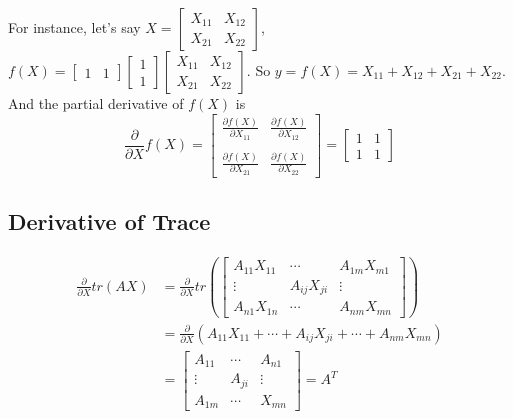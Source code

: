 \documentclass[titlepage]{article}
\begin{document}
For instance, let's say $X=\begin{bmatrix} X_{11}&X_{12}\\X_{21}&X_{22} \end{bmatrix}$,
$f(X)=\begin{bmatrix}1&1\end{bmatrix}\begin{bmatrix}1\\1\end{bmatrix}
\begin{bmatrix} X_{11}&X_{12}\\X_{21}&X_{22} \end{bmatrix}.$
So $y=f(X)=X_{11}+X_{12}+X_{21}+X_{22}.$ And the partial derivative of $f(X)$ is
\begin{equation}
    \frac{\partial}{\partial X}f(X) = 
    \begin{bmatrix} 
        \frac{\partial f(X)}{\partial X_{11}} & \frac{\partial f(X)}{\partial X_{12}} \\ \\
        \frac{\partial f(X)}{\partial X_{21}} & \frac{\partial f(X)}{\partial X_{22}}
     \end{bmatrix}
     =
     \begin{bmatrix} 
        1 & 1 \\
        1 & 1
     \end{bmatrix}
\end{equation}

\subsection{Derivative of Trace}

\begin{equation}
    \begin{aligned}
        \frac{\partial}{\partial X}tr({AX}) &= \frac{\partial}{\partial X} tr(
        \begin{bmatrix}
            A_{11}X_{11} & \cdots & A_{1m}X_{m1} \\
            \vdots & A_{ij}X_{ji} & \vdots \\
            A_{n1}X_{1n} & \cdots & A_{nm}X_{mn}
        \end{bmatrix}) \\
        &= \frac{\partial}{\partial X} 
        (A_{11}X_{11}+\cdots+A_{ij}X_{ji}+\cdots+A_{nm}X_{mn}) \\
        &=
        \begin{bmatrix}
            A_{11} & \cdots & A_{n1} \\
            \vdots & A_{ji} & \vdots \\
            A_{1m} & \cdots & X_{mn}
        \end{bmatrix}=A^T
    \end{aligned}
\end{equation}
\end{document}
